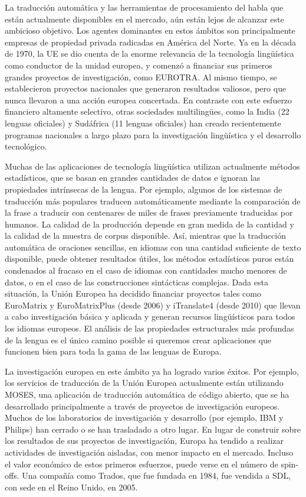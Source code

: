 \begin{multicols}{2}
  La traducción automática y las herramientas de procesamiento del habla que están actualmente disponibles en el mercado, aún están lejos de alcanzar este ambicioso objetivo. Los agentes dominantes en estos ámbitos son principalmente empresas de propiedad privada radicadas en América del Norte. Ya en la década de 1970, la UE se dio cuenta de la enorme relevancia de la tecnología lingüística como conductor de la unidad europea, y comenzó a financiar sus primeros grandes proyectos de investigación, como EUROTRA. Al mismo tiempo, se establecieron proyectos nacionales que generaron resultados valiosos, pero que nunca llevaron a una acción europea concertada. En contraste con este esfuerzo financiero altamente selectivo, otras sociedades multilingües, como la India (22 lenguas oficiales) y Sudáfrica (11 lenguas oficiales) han creado recientemente programas nacionales a largo plazo para la investigación lingüística y el desarrollo tecnológico.


  Muchas de las aplicaciones de tecnología lingüística utilizan actualmente métodos estadísticos, que se basan en grandes cantidades de datos e ignoran las propiedades intrínsecas de la lengua. Por ejemplo, algunos de los sistemas de traducción más populares traducen automáticamente mediante la comparación de la frase a traducir con centenares de miles de frases previamente traducidas por humanos. La calidad de la producción depende en gran medida de la cantidad y la calidad de la muestra de corpus disponible. Así, mientras que la traducción automática de oraciones sencillas, en idiomas con una cantidad suficiente de texto disponible, puede obtener resultados útiles, los métodos estadísticos puros están condenados al fracaso en el caso de idiomas con cantidades mucho menores de datos, o en el caso de las construcciones sintácticas complejas. Dada esta situación, la Unión Europea ha decidido financiar proyectos tales como EuroMatrix y EuroMatrixPlus (desde 2006) y iTranslate4 (desde 2010) que llevan a cabo investigación básica y aplicada y generan recursos lingüísticos para todos los idiomas europeos. El análisis de las propiedades estructurales más profundas de la lengua es el único camino posible si queremos crear aplicaciones que funcionen bien para toda la gama de las lenguas de Europa.

  La investigación europea en este ámbito ya ha logrado varios éxitos. Por ejemplo, los servicios de traducción de la Unión Europea actualmente están utilizando MOSES, una aplicación de traducción automática de código abierto, que se ha desarrollado principalmente a través de proyectos de investigación europeos. Muchos de los laboratorios de investigación y desarrollo (por ejemplo, IBM y Philips) han cerrado o se han trasladado a otro lugar. En lugar de construir sobre los resultados de sus proyectos de investigación, Europa ha tendido a realizar actividades de investigación aisladas, con menor impacto en el mercado. Incluso el valor económico de estos primeros esfuerzos, puede verse en el número de spin-offs. Una compañía como Trados, que fue fundada en 1984, fue vendida a SDL, con sede en el Reino Unido, en 2005.
  

\end{multicols}
